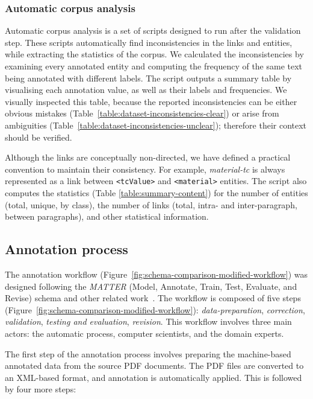 \documentclass[]{interact}
\theoremstyle{plain}%
\theoremstyle{definition}
\theoremstyle{remark}
\begin{document}
\subsubsection{Automatic corpus analysis}
Automatic corpus analysis is a set of scripts designed to run after the validation step. 
These scripts automatically find inconsistencies in the links and entities, while extracting the statistics of the corpus. 
We calculated the inconsistencies by examining every annotated entity and computing the frequency of the same text being annotated with different labels. 
The script outputs a summary table by visualising each annotation value, as well as their labels and frequencies.
We visually inspected this table, because the reported inconsistencies can be either obvious mistakes (Table~\ref{table:dataset-inconsistencies-clear}) or arise from ambiguities (Table~\ref{table:dataset-inconsistencies-unclear}); therefore their context should be verified. 

Although the links are conceptually non-directed, we have defined a practical convention to maintain their consistency. For example, \textit{material-tc} is always represented as a link between \texttt{<tcValue>} and \texttt{<material>} entities. 
The script also computes the statistics (Table \ref{table:summary-content}) for the number of entities (total, unique, by class), the number of links (total, intra- and inter-paragraph, between paragraphs), and other statistical information. 


\subsection{Annotation process}
\label{subsec:annotation-workflow}
The annotation workflow (Figure~\ref{fig:schema-comparison-modified-workflow}) was designed following the \textit{MATTER} (Model, Annotate, Train, Test, Evaluate, and Revise) schema\cite{pustejovsky2012natural} and other related work~\cite{Dieb2016, Krallinger2015TheCC}.
The workflow is composed of five steps (Figure~\ref{fig:schema-comparison-modified-workflow}): \textit{data-preparation}, \textit{correction}, \textit{validation}, \textit{testing and evaluation}, \textit{revision}. 
This workflow involves three main actors: the automatic process, computer scientists, and the domain experts.

The first step of the annotation process involves preparing the machine-based annotated data from the source PDF documents. 
The PDF files are converted to an XML-based format, and annotation is automatically applied. 
This is followed by four more steps: 
\end{document}
